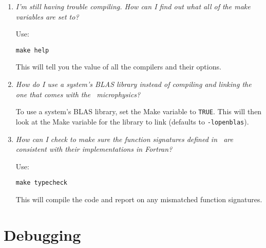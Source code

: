 \begin{enumerate}
\item {\em I'm still having trouble compiling.  How can I find out what
  all of the make variables are set to?}

  Use:
\begin{verbatim}
make help
\end{verbatim}
  This will tell you the value of all the compilers and their options.


\item {\em How do I use a system's BLAS library instead of compiling and
  linking the one that comes with the \starkiller\ microphysics?}

  To use a system's BLAS library, set the Make variable
   to {\tt TRUE}.  This will then look at
  the Make variable  for the library to link
  (defaults to {\tt -lopenblas}).


\item {\em How can I check to make sure the function signatures defined
 in \cpp\ are consistent with their implementations in Fortran?}

Use:
\begin{verbatim}
make typecheck
\end{verbatim}
This will compile the code and report on any mismatched function signatures.

\end{enumerate}

\section{Debugging}

